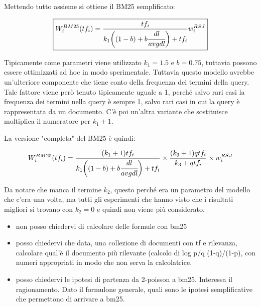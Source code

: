 Mettendo tutto assieme si ottiene il BM25 semplificato: 

\begin{align}
\boxed{
	W_i^{BM25}(tf_i) = \frac{tf_i}{k_1\bigg((1-b)+ b\cfrac{dl}{avgdl}\bigg) + tf_i } w_i^{RSJ}
}
\end{align}

Tipicamente come parametri viene utilizzato $k_1=1.5$ e $b=0.75$, tuttavia possono essere ottimizzati ad hoc in modo sperimentale.
Tuttavia questo modello avrebbe un'ulteriore componente che tiene conto della frequenza dei termini della query. Tale fattore viene però tenuto tipicamente uguale a 1, perché salvo rari casi la frequenza dei termini nella query è sempre 1, salvo rari casi in cui la query è rappresentata da un documento.
C'è poi un'altra variante che sostituisce moltiplica il numeratore per $k_1+1$.

La versione "completa" del BM25 è quindi:

\begin{align}
W_i^{BM25}(tf_i) = \frac{(k_1+1)tf_i}{k_1\bigg((1-b)+ b\cfrac{dl}{avgdl}\bigg) + tf_i } \times \frac{(k_3+1)qtf_i}{k_3 + qtf_i} \times w_i^{RSJ}
\end{align}

\noindent Da notare che manca il termine $k_2$, questo perché era un parametro del modello che c'era una volta, ma tutti gli esperimenti che hanno visto che i risultati migliori si trovano con $k_2=0$ e quindi non viene più considerato.

\begin{itemize}
\item non posso chiedervi di  calcolare delle formule con bm25

\item posso chiedervi che data, una collezione di documenti con tf e rilevanza, calcolare qual'è il documento più rilevante (calcolo di log p/q (1-q)/(1-p), con numeri appropriati in modo che non serva la calcolatrice.

\item posso chiedervi le ipotesi di partenza da 2-poisson a bm25. Interessa il ragionamento. Dato il formulone generale, quali sono le ipotesi semplificative che permettono di arrivare a bm25.
\end{itemize}










